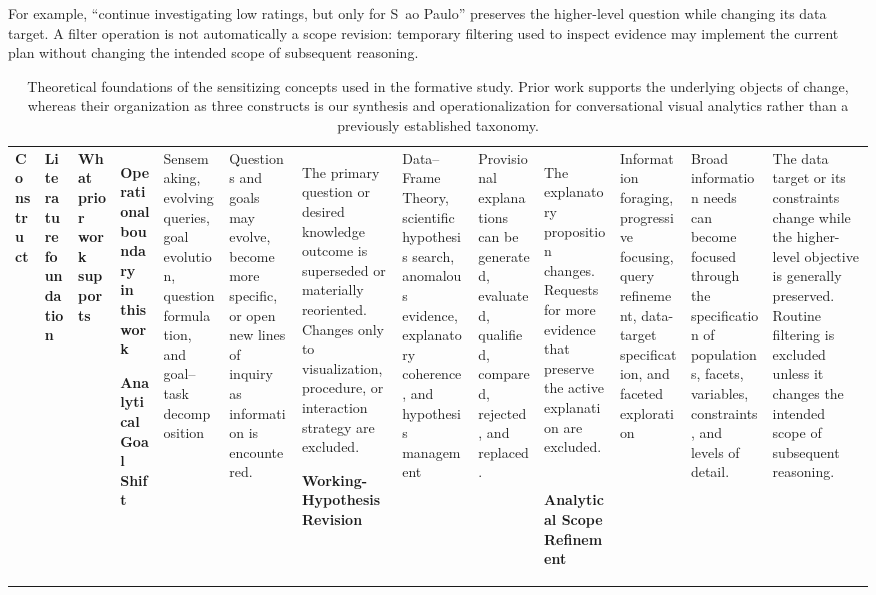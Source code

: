 \documentclass[journal]{IEEEtran}
\begin{document}
For example, ``continue investigating low ratings, but only for S~ao Paulo''
preserves the higher-level question while changing its data target. A filter
operation is not automatically a scope revision: temporary filtering used to
inspect evidence may implement the current plan without changing the intended
scope of subsequent reasoning.

\begin{table}[t]
\centering
\caption{Theoretical foundations of the sensitizing concepts used in the
formative study. Prior work supports the underlying objects of change, whereas
their organization as three constructs is our synthesis and operationalization
for conversational visual analytics rather than a previously established
taxonomy.}
\label{tab:revision-foundations}
\small
\begin{tabular}{
p{}
p{}
p{}
p{}}
\toprule
\textbf{Construct} &
\textbf{Literature foundation} &
\textbf{What prior work supports} &
\textbf{Operational boundary in this work} \
\midrule

\textbf{Analytical Goal Shift} &
Sensemaking, evolving queries, goal evolution, question formulation, and
goal--task decomposition
\cite{russell1993cost,pirolli2005sensemaking,
bates1989berrypicking,vakkari2001changes,
sacha2014knowledge,battle2019characterizing,
lam2018bridging} &
Questions and goals may evolve, become more specific, or open new lines of
inquiry as information is encountered. &
The primary question or desired knowledge outcome is superseded or materially
reoriented. Changes only to visualization, procedure, or interaction strategy
are excluded. \

\textbf{Working-Hypothesis Revision} &
Data--Frame Theory, scientific hypothesis search, anomalous evidence,
explanatory coherence, and hypothesis management
\cite{klein2007dataframe,pontis2016influence,
klahr1988dual,chinn1993anomalous,
thagard1989explanatory,sacha2014knowledge,
shrinivasan2008supporting,jun2022hypothesis} &
Provisional explanations can be generated, evaluated, qualified, compared,
rejected, and replaced. &
The explanatory proposition changes. Requests for more evidence that preserve
the active explanation are excluded. \

\textbf{Analytical Scope Refinement} &
Information foraging, progressive focusing, query refinement, data-target
specification, and faceted exploration
\cite{pirolli1999information,bates1989berrypicking,
vakkari2001changes,battle2019characterizing,
brehmer2013multilevel,lam2018bridging,
wongsuphasawat2016voyager} &
Broad information needs can become focused through the specification of
populations, facets, variables, constraints, and levels of detail. &
The data target or its constraints change while the higher-level objective is
generally preserved. Routine filtering is excluded unless it changes the
intended scope of subsequent reasoning. \
\bottomrule
\end{tabular}
\end{table}
\end{document}
